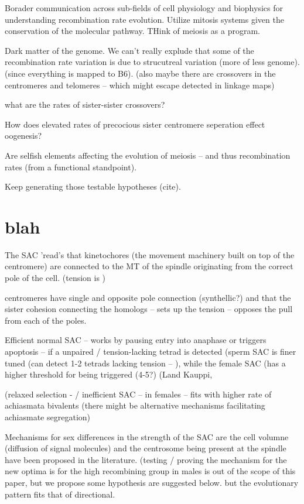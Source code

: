 \documentclass[]{article}
\begin{document}
Borader communication across sub-fields of cell physiology and
biophysics for understanding recombination rate evolution. Utilize
mitosis systems given the conservation of the molecular pathway. THink
of meiosis as a program.

Dark matter of the genome. We can't really explude that some of the
recombination rate variation is due to strucutreal variation (more of
less genome). (since everything is mapped to B6). (also maybe there are
crossovers in the centromeres and telomeres -- which might escape
detected in linkage maps)

what are the rates of sister-sister crossovers?

How does elevated rates of precocious sister centromere seperation
effect oogenesis?

Are selfish elements affecting the evolution of meiosis -- and thus
recombination rates (from a functional standpoint).

Keep generating those testable hypotheses (cite).

\section{blah}\label{blah}

The SAC 'read's that kinetochores (the movement machinery built on top
of the centromere) are connected to the MT of the spindle originating
from the correct pole of the cell. (tension is )

centromeres have single and opposite pole connection (synthellic?) and
that the sister cohesion connecting the homologs -- sets up the tension
-- opposes the pull from each of the poles.

Efficient normal SAC -- works by pausing entry into anaphase or triggers
apoptosis -- if a unpaired / tension-lacking tetrad is detected (sperm
SAC is finer tuned (can detect 1-2 tetrads lacking tension -- ), while
the female SAC (has a higher threshold for being triggered (4-5?) (Land
Kauppi,

(relaxed selection - / inefficient SAC -- in females -- fits with higher
rate of achiasmata bivalents (there might be alternative mechanisms
facilitating achiasmate segregation)

Mechanisms for sex differences in the strength of the SAC are the cell
volumne (diffusion of signal molecules) and the centrosome being present
at the spindle have been proposed in the literature. (testing / proving
the mechanism for the new optima is for the high recombining group in
males is out of the scope of this paper, but we propose some hypothesis
are suggested below. but the evolutionary pattern fits that of
directional.
\end{document}
